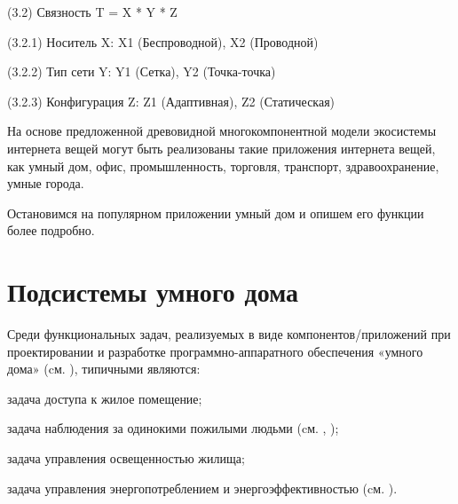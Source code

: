(3.2) Связность T = X * Y * Z

    (3.2.1) Носитель X: X1 (Беспроводной), X2 (Проводной)

    (3.2.2) Тип сети Y: Y1 (Сетка), Y2 (Точка-точка)

    (3.2.3) Конфигурация Z: Z1 (Адаптивная), Z2 (Статическая)

На основе предложенной древовидной многокомпонентной модели экосистемы интернета вещей могут быть реализованы такие приложения интернета вещей, как умный дом, офис, промышленность, торговля, транспорт, здравоохранение, умные города.

Остановимся на популярном приложении умный дом и опишем его функции более подробно.

\section{Подсистемы умного дома}
\label{sec_SH_subsystems}

Среди функциональных задач, реализуемых в виде компонентов/приложений при проектировании и разработке программно-аппаратного обеспечения «умного дома» (cм. ), типичными являются:
\begin{textitemize}
\item задача доступа к жилое помещение;
\item задача наблюдения за одинокими пожилыми людьми (cм. , );
\item задача управления освещенностью жилища;
\item задача управления энергопотреблением и энергоэффективностью (cм. ).
\end{textitemize}

